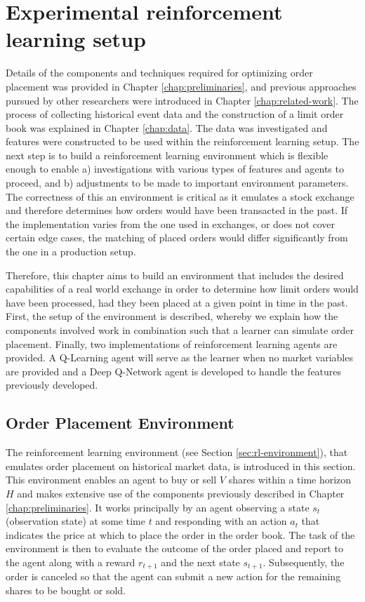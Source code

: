 \chapter{Experimental reinforcement learning setup}
\label{chap:setup}

Details of the components and techniques required for optimizing order placement was provided in Chapter \ref{chap:preliminaries}, and previous approaches pursued by other researchers were introduced in Chapter \ref{chap:related-work}.
The process of collecting historical event data and the construction of a limit order book was explained in Chapter \ref{chap:data}.
The data was investigated and features were constructed to be used within the reinforcement learning setup.
The next step is to build a reinforcement learning environment which is flexible enough to enable a) investigations with various types of features and agents to proceed, and b) adjustments to be made to important environment parameters.
The correctness of this an environment is critical as it emulates a stock exchange and therefore determines how orders would have been transacted in the past.
If the implementation varies from the one used in exchanges, or does not cover certain edge cases, the matching of placed orders would differ significantly from the one in a production setup.

Therefore, this chapter aims to build an environment that includes the desired capabilities of a real world exchange in order to determine how limit orders would have been processed, had they been placed at a given point in time in the past.
First, the setup of the environment is described, whereby we explain how the components involved work in combination such that a learner can simulate order placement.
Finally, two implementations of reinforcement learning agents are provided.
A Q-Learning agent will serve as the learner when no market variables are provided and a Deep Q-Network agent is developed to handle the features previously developed.

\section{Order Placement Environment}
\label{sec:setup-order-placement}

The reinforcement learning environment (see Section \ref{sec:rl-environment}), that emulates order placement on historical market data, is introduced in this section.
This environment enables an agent to buy or sell $V$ shares within a time horizon $H$ and makes extensive use of the components previously described in Chapter \ref{chap:preliminaries}.
It works principally by an agent observing a state $s_t$ (observation state) at some time $t$ and responding with an action $a_t$ that indicates the price at which to place the order in the order book.
The task of the environment is then to evaluate the outcome of the order placed and report to the agent along with a reward $r_{t+1}$ and the next state $s_{t+1}$.
Subsequently, the order is canceled so that the agent can submit a new action for the remaining shares to be bought or sold.

